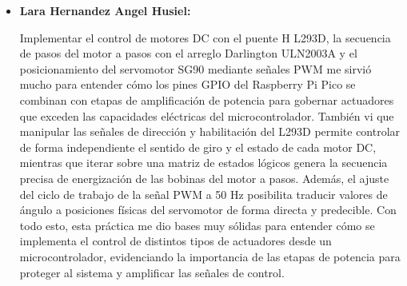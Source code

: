 \documentclass[letterpaper,12pt]{article}
\begin{document}
\begin{itemize}
        En el caso de los motores de corriente directa con el puente H L293D, se comprobó el control independiente del sentido de giro y estados de operación, incluyendo condiciones seguras de paro


        \item \textbf{Lara Hernandez Angel Husiel:} 
        
        Implementar el control de motores DC con el puente H L293D, la secuencia de pasos del motor a pasos con el arreglo Darlington ULN2003A y el posicionamiento del servomotor SG90 mediante señales PWM me sirvió mucho para entender cómo los pines GPIO del Raspberry Pi Pico se combinan con etapas de amplificación de potencia para gobernar actuadores que exceden las capacidades eléctricas del microcontrolador. También vi que manipular las señales de dirección y habilitación del L293D permite controlar de forma independiente el sentido de giro y el estado de cada motor DC, mientras que iterar sobre una matriz de estados lógicos genera la secuencia precisa de energización de las bobinas del motor a pasos. Además, el ajuste del ciclo de trabajo de la señal PWM a 50 Hz posibilita traducir valores de ángulo a posiciones físicas del servomotor de forma directa y predecible. Con todo esto, esta práctica me dio bases muy sólidas para entender cómo se implementa el control de distintos tipos de actuadores desde un microcontrolador, evidenciando la importancia de las etapas de potencia para proteger al sistema y amplificar las señales de control.
    \end{itemize}

    \newpage

    \nocite{*}
    \printbibliography[heading=bibintoc, title={Referencias}]
\end{document}

